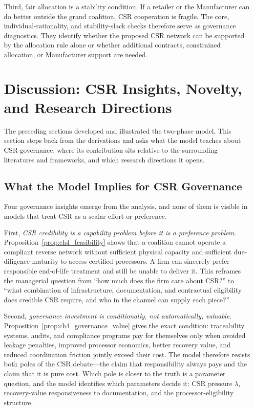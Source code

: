 Third, fair allocation is a stability condition. If a retailer or the Manufacturer can do better outside the grand coalition, CSR cooperation is fragile. The core, individual-rationality, and stability-slack checks therefore serve as governance diagnostics. They identify whether the proposed CSR network can be supported by the allocation rule alone or whether additional contracts, constrained allocation, or Manufacturer support are needed.

\section{Discussion: CSR Insights, Novelty, and Research Directions}
\label{sec:ch4_discussion}

The preceding sections developed and illustrated the two-phase model. This section steps back from the derivations and asks what the model teaches about CSR governance, where its contribution sits relative to the surrounding literatures and frameworks, and which research directions it opens.

\subsection{What the Model Implies for CSR Governance}

Four governance insights emerge from the analysis, and none of them is visible in models that treat CSR as a scalar effort or preference.

First, \emph{CSR credibility is a capability problem before it is a preference problem}. Proposition~\ref{prop:ch4_feasibility} shows that a coalition cannot operate a compliant reverse network without sufficient physical capacity and sufficient due-diligence maturity to access certified processors. A firm can sincerely prefer responsible end-of-life treatment and still be unable to deliver it. This reframes the managerial question from ``how much does the firm care about CSR?'' to ``what combination of infrastructure, documentation, and contractual eligibility does credible CSR require, and who in the channel can supply each piece?''

Second, \emph{governance investment is conditionally, not automatically, valuable}. Proposition~\ref{prop:ch4_governance_value} gives the exact condition: traceability systems, audits, and compliance programs pay for themselves only when avoided leakage penalties, improved processor economics, better recovery value, and reduced coordination friction jointly exceed their cost. The model therefore resists both poles of the CSR debate---the claim that responsibility always pays and the claim that it is pure cost. Which pole is closer to the truth is a parameter question, and the model identifies which parameters decide it: CSR pressure $\lambda$, recovery-value responsiveness to documentation, and the processor-eligibility structure.

